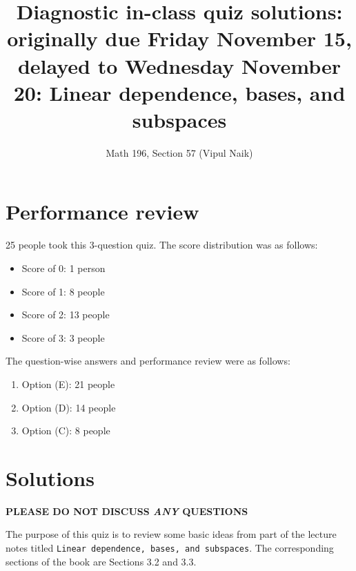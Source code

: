 \documentclass[10pt]{amsart}
\title{Diagnostic in-class quiz solutions: originally due Friday November 15, delayed to Wednesday November 20: Linear dependence, bases, and subspaces}
\author{Math 196, Section 57 (Vipul Naik)}
\begin{document}
\maketitle

\section{Performance review}

25 people took this 3-question quiz. The score distribution was as follows:

\begin{itemize}
\item Score of 0: 1 person
\item Score of 1: 8 people
\item Score of 2: 13 people
\item Score of 3: 3 people
\end{itemize}

The question-wise answers and performance review were as follows:

\begin{enumerate}
\item Option (E): 21 people
\item Option (D): 14 people
\item Option (C): 8 people
\end{enumerate}

\section{Solutions}

{\bf PLEASE DO NOT DISCUSS {\em ANY} QUESTIONS}

The purpose of this quiz is to review some basic ideas from part of
the lecture notes titled {\tt Linear dependence, bases, and
  subspaces}. The corresponding sections of the book are Sections 3.2
and 3.3.
\end{document}
